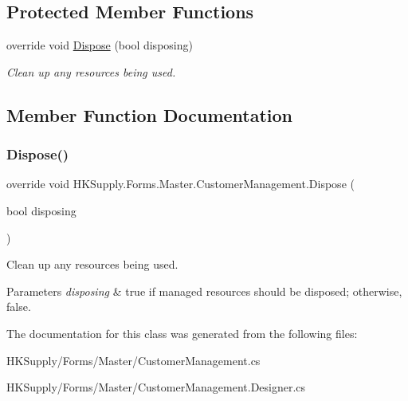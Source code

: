 \subsection*{Protected Member Functions}
\begin{DoxyCompactItemize}
\item 
override void \hyperlink{class_h_k_supply_1_1_forms_1_1_master_1_1_customer_management_a3ecb762babe54f6e25edb87033beb8f6}{Dispose} (bool disposing)
\begin{DoxyCompactList}\small\item\em Clean up any resources being used. \end{DoxyCompactList}\end{DoxyCompactItemize}


\subsection{Member Function Documentation}
\mbox{\label{class_h_k_supply_1_1_forms_1_1_master_1_1_customer_management_a3ecb762babe54f6e25edb87033beb8f6}} 
\subsubsection{\texorpdfstring{Dispose()}{Dispose()}}
{\footnotesize\ttfamily override void H\+K\+Supply.\+Forms.\+Master.\+Customer\+Management.\+Dispose (\begin{DoxyParamCaption}\item[{bool}]{disposing }\end{DoxyParamCaption})\hspace{0.3cm}{\ttfamily [protected]}}



Clean up any resources being used. 


\begin{DoxyParams}{Parameters}
{\em disposing} & true if managed resources should be disposed; otherwise, false.\\
\hline
\end{DoxyParams}


The documentation for this class was generated from the following files\+:\begin{DoxyCompactItemize}
\item 
H\+K\+Supply/\+Forms/\+Master/Customer\+Management.\+cs\item 
H\+K\+Supply/\+Forms/\+Master/Customer\+Management.\+Designer.\+cs\end{DoxyCompactItemize}
